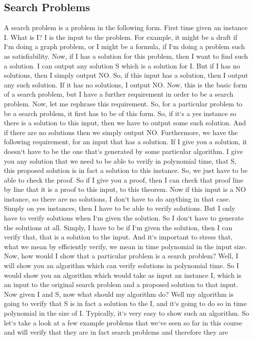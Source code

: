 \subsection{Search Problems}
A search problem is a problem in the following form.
First time given an instance I\@.
What is I? I is the input to the problem.
For example, it might be a draft if I`m doing a graph problem, or I might be a formula, if I`m doing a problem such as satisfiability.
Now, if I has a solution for this problem, then I want to find such a solution.
I can output any solution S which is a solution for I\@.
But if I has no solutions, then I simply output NO\@.
So, if this input has a solution, then I output any such solution.
If it has no solutions, I output NO\@.
Now, this is the basic form of a search problem, but I have a further requirement in order to be a search problem.
Now, let me rephrase this requirement.
So, for a particular problem to be a search problem, it first has to be of this form.
So, if it`s a yes instance so there is a solution to this input, then we have to output some such solution.
And if there are no solutions then we simply output NO\@.
Furthermore, we have the following requirement, for an input that has a solution.
If I give you a solution, it doesn`t have to be the one that`s generated by some particular algorithm.
I give you any solution that we need to be able to verify in polynomial time, that S, this proposed solution is in fact a solution to this instance.
So, we just have to be able to check the proof.
So if I give you a proof, then I can check that proof line by line that it is a proof to this input, to this theorem.
Now if this input is a NO instance, so there are no solutions, I don`t have to do anything in that case.
Simply on yes instances, then I have to be able to verify solutions.
But I only have to verify solutions when I`m given the solution.
So I don`t have to generate the solutions at all.
Simply, I have to be if I`m given the solution, then I can verify that, that is a solution to the input.
And it`s important to stress that, what we mean by efficiently verify, we mean in time polynomial in the input size.
Now, how would I show that a particular problem is a search problem? Well, I will show you an algorithm which can verify solutions in polynomial time.
So I would show you an algorithm which would take as input an instance I, which is an input to the original search problem and a proposed solution to that input.
Now given I and S, now what should my algorithm do? Well my algorithm is going to verify that S is in fact a solution to the I, and it`s going to do so in time polynomial in the size of I\@.
Typically, it`s very easy to show such an algorithm.
So let`s take a look at a few example problems that we`ve seen so far in this course and will verify that they are in fact search problems and therefore they are

